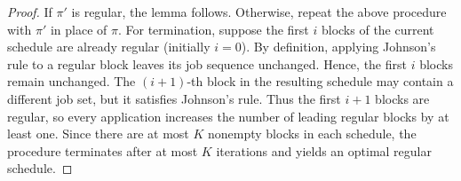 ﻿\documentclass[12pt]{article} \textheight=24.5cm \textwidth=16.5cm \parskip = 0.165cm
\begin{document}
\begin{sloppypar}
\begin{proof}
        If $\pi'$ is regular, the lemma follows.
        Otherwise, repeat the above procedure with $\pi'$ in place of $\pi$.
        For termination, suppose the first $i$ blocks of the current schedule are already regular (initially $i=0$).
        By definition, applying Johnson's rule to a regular block leaves its job sequence unchanged.
        Hence, the first $i$ blocks remain unchanged.
        The $(i+1)$-th block in the resulting schedule may contain a different job set, but it satisfies Johnson's rule.
        Thus the first $i+1$ blocks are regular, so every application increases the number of leading regular blocks by at least one.
        Since there are at most $K$ nonempty blocks in each schedule, the procedure terminates after at most $K$ iterations and yields an optimal regular schedule.
        \end{proof}


\end{sloppypar}
\end{document}
